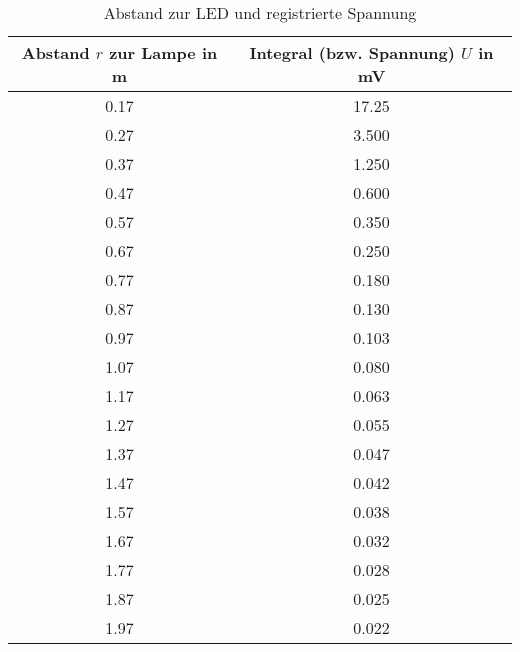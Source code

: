 \begin{table}[b!]
\begin{center}
\begin{tabular}{c | c}
	Abstand $r$ zur Lampe in \si{\metre} & Integral (bzw. Spannung) $U$ in \si{\milli\volt} \\
	\hline
	0.17 & 17.25 \\
	0.27 & 3.500 \\
	0.37 & 1.250 \\
	0.47 & 0.600 \\
	0.57 & 0.350 \\
	0.67 & 0.250 \\
	0.77 & 0.180 \\
	0.87 & 0.130 \\
	0.97 & 0.103 \\
	1.07 & 0.080 \\
	1.17 & 0.063 \\
	1.27 & 0.055 \\
	1.37 & 0.047 \\
	1.47 & 0.042 \\
	1.57 & 0.038 \\
	1.67 & 0.032 \\
	1.77 & 0.028 \\
	1.87 & 0.025 \\
	1.97 & 0.022
\end{tabular}
\caption{Abstand zur LED und registrierte Spannung}
\label{Tabelle_Lampe}
\end{center}
\end{table}